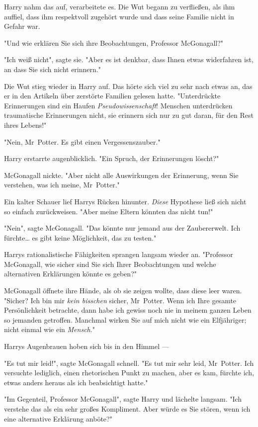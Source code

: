 {Harry nahm das auf, verarbeitete es. Die Wut begann zu verfließen, als ihm auffiel, dass ihm respektvoll zugehört wurde und dass seine Familie nicht in Gefahr war.

"Und wie erklären Sie sich ihre Beobachtungen, Professor McGonagall?"

"Ich weiß nicht", sagte sie. "Aber es ist denkbar, dass Ihnen etwas widerfahren ist, an dass Sie sich nicht erinnern."

Die Wut stieg wieder in Harry auf. Das hörte sich viel zu sehr nach etwas an, das er in den Artikeln über zerstörte Familien gelesen hatte. "Unterdrückte Erinnerungen sind ein Haufen \emph{Pseudowissenschaft}! Menschen unterdrücken traumatische Erinnerungen nicht, sie erinnern sich nur zu gut daran, für den Rest ihres Lebens!"

"Nein, Mr~Potter. Es gibt einen Vergessenszauber."

Harry erstarrte augenblicklich. "Ein Spruch, der Erinnerungen löscht?"

McGonagall nickte. "Aber nicht alle Auswirkungen der Erinnerung, wenn Sie verstehen, was ich meine, Mr~Potter."

Ein kalter Schauer lief Harrys Rücken hinunter. \emph{Diese} Hypothese ließ sich nicht so einfach zurückweisen. "Aber meine Eltern könnten das nicht tun!"

"Nein", sagte McGonagall. "Das könnte nur jemand aus der Zaubererwelt. Ich fürchte… es gibt keine Möglichkeit, das zu testen."

Harrys rationalistische Fähigkeiten sprangen langsam wieder an. "Professor McGonagall, wie sicher sind Sie sich Ihrer Beobachtungen und welche alternativen Erklärungen könnte es geben?"

McGonagall öffnete ihre Hände, als ob sie zeigen wollte, dass diese leer waren. "Sicher? Ich bin mir \emph{kein bisschen} sicher, Mr~Potter. Wenn ich Ihre gesamte Persönlichkeit betrachte, dann habe ich gewiss noch nie in meinem ganzen Leben so jemanden getroffen. Manchmal wirken Sie auf mich nicht wie ein Elfjähriger; nicht einmal wie ein \emph{Mensch}."

Harrys Augenbrauen hoben sich bis in den Himmel ---

"Es tut mir leid!", sagte McGonagall schnell. "Es tut mir sehr leid, Mr~Potter. Ich versuchte lediglich, einen rhetorischen Punkt zu machen, aber es kam, fürchte ich, etwas anders heraus als ich beabsichtigt hatte."

"Im Gegenteil, Professor McGonagall", sagte Harry und lächelte langsam. "Ich verstehe das als ein sehr großes Kompliment. Aber würde es Sie stören, wenn ich eine alternative Erklärung anböte?"

}
